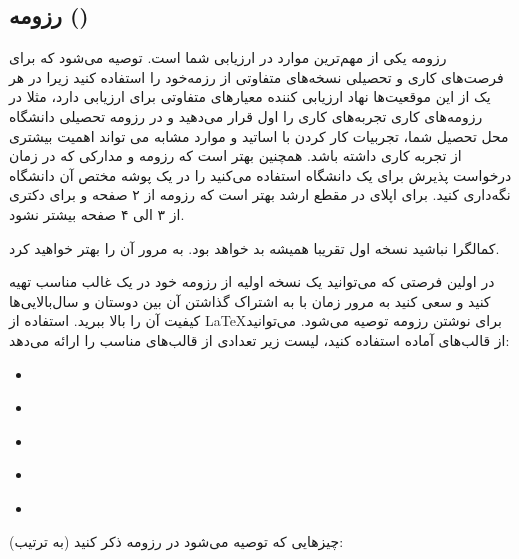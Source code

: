 \subsection{رزومه ()}\label{ssec:cv}
رزومه یکی از مهم‌ترین موارد در ارزیابی شما است. توصیه می‌شود که برای فرصت‌های کاری و تحصیلی نسخه‌های متفاوتی از رزمه‌خود را استفاده کنید زیرا در هر یک
از این موقعیت‌ها نهاد ارزیابی کننده معیار‌های متفاوتی برای ارزیابی دارد، مثلا در رزومه‌های کاری تجربه‌های کاری را اول قرار می‌دهید و در رزومه تحصیلی دانشگاه محل
تحصیل شما، تجربیات کار کردن با اساتید و موارد مشابه می تواند اهمیت بیشتری از تجربه کاری داشته باشد. 
همچنین بهتر است که رزومه‌ و مدارکی که در زمان درخواست پذیرش برای یک دانشگاه استفاده می‌کنید را در یک پوشه مختص آن دانشگاه نگه‌داری کنید. 
برای اپلای در مقطع ارشد بهتر است که رزومه از ۲ صفحه و برای دکتری از ۳ الی ۴ صفحه بیشتر نشود. 

\begin{tipbox}
  کمالگرا نباشید نسخه اول تقریبا همیشه بد خواهد بود. به مرور آن را بهتر خواهید کرد.
\end{tipbox}


در اولین فرصتی که می‌توانید یک نسخه اولیه از رزومه خود در یک غالب مناسب تهیه کنید و سعی کنید به مرور زمان با به اشتراک گذاشتن آن بین دوستان و سال‌بالایی‌ها
کیفیت آن را بالا ببرید. استفاده از \LaTeX برای نوشتن رزومه توصیه می‌شود. می‌توانید از قالب‌های آماده استفاده کنید، لیست زیر تعدادی
از قالب‌‌های مناسب را ارائه می‌دهد:

\begin{itemize}[leftmargin=1.5cm]
\item \href{https://www.overleaf.com/latex/templates/harshibars-resume/sbcyynmtpnyd}{}
\item \href{https://www.overleaf.com/latex/templates/autocv/scfvqfpxncwb}{}
\item \href{https://www.overleaf.com/latex/templates/plantilla-cv-espanol/ttbgvmyjcpfb}{}
\item \href{https://www.overleaf.com/articles/yash-thakurs-curriculum-vitae/grsjzdtqqrzj}{}
\item \href{https://www.latextemplates.com/template/medium-length-graduate-cv}{}
\end{itemize}

چیزهایی که توصیه می‌شود در رزومه ذکر کنید (به ترتیب):

